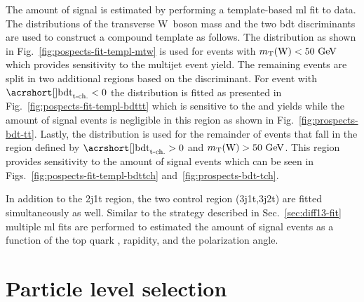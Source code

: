 The amount of signal is estimated by performing a template-based \gls{ml} fit to data. The distributions of the transverse W~boson mass and the two \gls{bdt} discriminants are used to construct a compound template as follows. The \mtw distribution as shown in Fig.~\ref{fig:pospects-fit-templ-mtw} is used for events with $m_{\textrm{T}}(\textrm{W})<50~\textrm{GeV}$ which provides sensitivity to the multijet event yield. The remaining events are split in two additional regions based on the \bdttch discriminant. For event with $\bdttch<0$ the \bdttt distribution is fitted as presented in Fig.~\ref{fig:pospects-fit-templ-bdttt} which is sensitive to the \wjets and \ttbar yields while the amount of signal events is negligible in this region as shown in Fig.~\ref{fig:prospects-bdt-tt}. Lastly, the \bdttch distribution is used for the remainder of events that fall in the region defined by $\bdttch>0$ and $m_{\textrm{T}}(\textrm{W})>50~\textrm{GeV}$. This region provides sensitivity to the amount of signal events which can be seen in Figs.~\ref{fig:pospects-fit-templ-bdttch} and~\ref{fig:prospects-bdt-tch}.


In addition to the 2j1t region, the two \ttbar control region (3j1t,3j2t) are fitted simultaneously as well. Similar to the strategy described in Sec.~\ref{sec:diff13-fit} multiple \gls{ml} fits are performed to estimated the amount of signal events as a function of the top quark \pt, rapidity, and the polarization angle.

 

\section{Particle level selection}
\label{sec:prospects-fiducial-studies}

